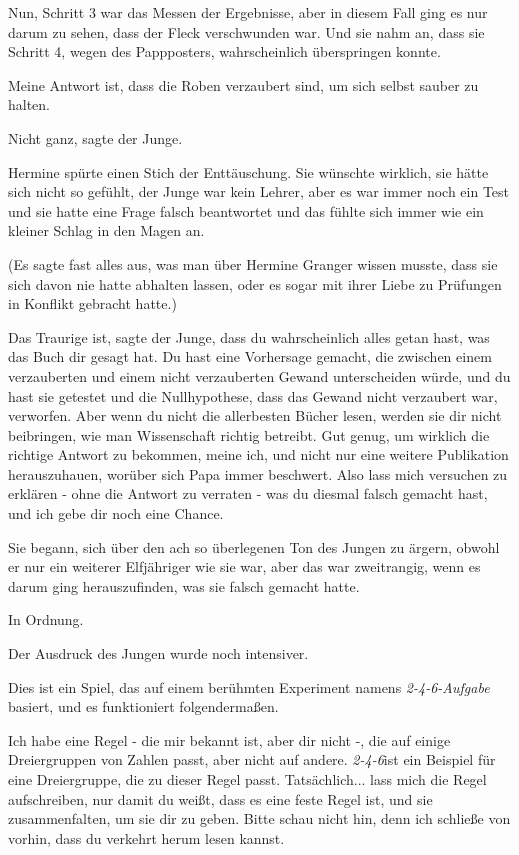 Nun, Schritt 3 war das Messen der Ergebnisse, aber in diesem Fall ging es nur
darum zu sehen, dass der Fleck verschwunden war. Und sie nahm an, dass sie
Schritt 4, wegen des Pappposters, wahrscheinlich überspringen konnte.

\glqq Meine Antwort ist, dass die Roben verzaubert sind, um sich selbst sauber
zu halten.\grqq{}

\glqq Nicht ganz\grqq{}, sagte der Junge.

Hermine spürte einen Stich der Enttäuschung. Sie wünschte wirklich, sie hätte
sich nicht so gefühlt, der Junge war kein Lehrer, aber es war immer noch ein
Test und sie hatte eine Frage falsch beantwortet und das fühlte sich immer wie
ein kleiner Schlag in den Magen an.

(Es sagte fast alles aus, was man über Hermine Granger wissen musste, dass sie
sich davon nie hatte abhalten lassen, oder es sogar mit ihrer Liebe zu Prüfungen
in Konflikt gebracht hatte.)

\glqq Das Traurige ist\grqq{}, sagte der Junge, \glqq dass du wahrscheinlich
alles getan hast, was das Buch dir gesagt hat. Du hast eine Vorhersage gemacht,
die zwischen einem verzauberten und einem nicht verzauberten Gewand
unterscheiden würde, und du hast sie getestet und die Nullhypothese, dass das
Gewand nicht verzaubert war, verworfen. Aber wenn du nicht die allerbesten
Bücher lesen, werden sie dir nicht beibringen, wie man Wissenschaft richtig
betreibt. Gut genug, um wirklich die richtige Antwort zu bekommen, meine ich,
und nicht nur eine weitere Publikation herauszuhauen, worüber sich Papa immer
beschwert. Also lass mich versuchen zu erklären - ohne die Antwort zu verraten -
was du diesmal falsch gemacht hast, und ich gebe dir noch eine Chance.\grqq{}

Sie begann, sich über den ach so überlegenen Ton des Jungen zu ärgern, obwohl er
nur ein weiterer Elfjähriger wie sie war, aber das war zweitrangig, wenn es
darum ging herauszufinden, was sie falsch gemacht hatte.

\glqq In Ordnung.\grqq{}

Der Ausdruck des Jungen wurde noch intensiver.

\glqq Dies ist ein Spiel, das auf einem berühmten Experiment namens
\emph{2-4-6-Aufgabe }basiert, und es funktioniert folgendermaßen.

Ich habe eine Regel - die mir bekannt ist, aber dir nicht -, die auf einige
Dreiergruppen von Zahlen passt, aber nicht auf andere. \emph{2-4-6}ist ein
Beispiel für eine Dreiergruppe, die zu dieser Regel passt. Tatsächlich... lass
mich die Regel aufschreiben, nur damit du weißt, dass es eine feste Regel ist,
und sie zusammenfalten, um sie dir zu geben. Bitte schau nicht hin, denn ich
schließe von vorhin, dass du verkehrt herum lesen kannst.\grqq{}

